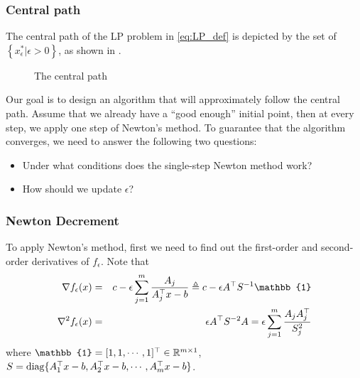 \subsubsection{Central path}
The central path of the LP problem in \ref{eq:LP_def} is depicted by the set of
$\left\{x^*_\epsilon|\epsilon>0\right\}$, as shown in .
\begin{figure}[h!]
\centering
{}
\caption{The central path\label{fig:central_path}}
\end{figure}

Our goal is to design an algorithm that will approximately follow the central
path. Assume that we already have a ``good enough'' initial point, then at every step, we apply one step of Newton's method. To guarantee that the algorithm converges, we need to answer the following two questions:
\begin{itemize}
\item Under what conditions does the single-step Newton method work?
\item How should we update $\epsilon$?
\end{itemize}

\subsubsection{Newton Decrement}
To apply Newton's method, first we need to find out the first-order and second-order derivatives of $f_\epsilon$. Note that
\begin{eqnarray}
\nabla f_\epsilon(x)&=&c-\epsilon \sum_{j=1}^m \dfrac{A_j}{A^\trans_j x-b}\triangleq c-\epsilon A^\trans S^{-1}\mathbb{1}\label{eq:grad_f_eps}\\
\nabla^2f_\epsilon(x)&=&\epsilon A^\trans S^{-2}A=\epsilon \sum_{j=1}^m\dfrac{A_j A_j^\trans}{S_j^2}\label{eq:hessian_f_eps}
\end{eqnarray}
where $\mathbb{1}=[1,1,\cdots,1]^\trans\in\mathbb{R}^{m\times1}$, $S=\mathrm{diag}\{A^\top_1 x-b, A^\top_2 x-b, \cdots, A^\top_m x-b\}$.

